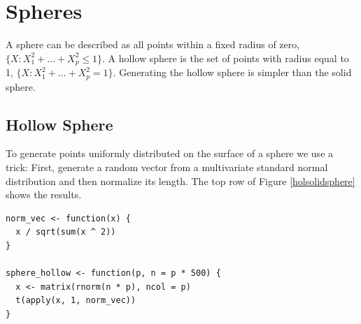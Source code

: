\section{Spheres}

A sphere can be described as all
points within a fixed radius of zero, $\{X: X_1^2+\dots + X_p^2 \leq 1\}$.  A hollow sphere is the set of points with radius equal to 1, $\{X: X_1^2+\dots + X_p^2 = 1\}$. Generating the hollow sphere is simpler than the solid sphere.

\subsection{Hollow Sphere}

To generate points uniformly distributed on the surface of a sphere we
use a trick: First, generate a random vector from a multivariate
standard normal distribution and then normalize its length. The top
row of Figure \ref{holsolidsphere} shows the results.

\begin{verbatim}
norm_vec <- function(x) {
  x / sqrt(sum(x ^ 2))
}

sphere_hollow <- function(p, n = p * 500) {
  x <- matrix(rnorm(n * p), ncol = p)
  t(apply(x, 1, norm_vec))
}
\end{verbatim}

